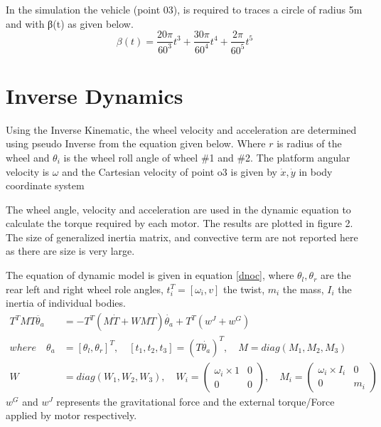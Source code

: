 In the simulation the vehicle (point 03), is required to traces a circle of radius 5m and with β(t) as given below.
\begin{equation}
\label{path}
\beta(t)=\frac{20\pi}{60^3}t^3+\frac{30\pi}{60^4}t^4+\frac{2\pi}{60^5}t^5
\end{equation}

\section{Inverse Dynamics}
Using the Inverse Kinematic,  the wheel velocity and acceleration are determined using pseudo Inverse   from the equation given below. Where $r$ is radius of the wheel and $\theta_i$ is the wheel roll angle of wheel \#1 and \#2. The platform angular velocity is $\omega$ and the Cartesian velocity of point o3 is given by $\dot{x},\dot{y}$ in body coordinate system
   
The wheel angle, velocity and acceleration are used in the dynamic equation  to calculate the torque required by each motor. The results are plotted in figure 2.  The size of generalized inertia matrix,    and convective term   are not reported here as there are size is very large.


The equation of  dynamic model  is given in equation \ref{dnoc}, where $\theta_l, \theta_r $ are the rear left and right wheel role angles, $t_i^T=[\omega_i, v]$ the twist, $m_i$ the mass, $I_i$ the inertia of individual bodies.
\begin{equation}
\label{dnoc}
\begin{aligned}
T^TMT\ddot{\theta_a}&=-T^T(M\dot{T}+WMT)\dot{\theta_a}+T^T(w^J+w^G)\\
where\quad \theta_a&=[\theta_l, \theta_r]^T , \quad [t_1,t_2,t_3]=(T\dot{\theta_a})^T, \quad M=diag(M_1, M_2, M_3)\\
W&=diag(W_1,W_2,W_3),\quad W_i=\begin{pmatrix}
\omega_i\times 1 & 0\\ 0 & 0
\end{pmatrix},\quad M_i=\begin{pmatrix}
\omega_i\times I_i & 0\\ 0 & m_i
\end{pmatrix}
\end{aligned}
\end{equation}
$w^G$ and $ w^J$ represents the gravitational force and the external torque/Force applied by motor respectively. 

